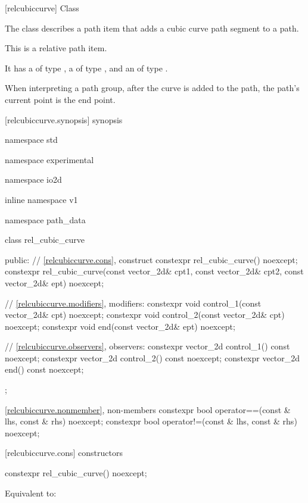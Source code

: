  [relcubiccurve] {Class }%

\pnum
{}%
The class  describes a path item that adds a cubic \bezierlocal curve path segment to a path.

\pnum
This is a relative path item.

\pnum
It has a  of type , a  of type , and an  of type .

\pnum
When interpreting a path group, after the curve is added to the path, the path's current point is the end point.

 [relcubiccurve.synopsis] { synopsis}%

\begin{codeblock}
namespace std { namespace experimental { namespace io2d { inline namespace v1 {
  namespace path_data {
    class rel_cubic_curve {
    public:
      // \ref{relcubiccurve.cons}, construct
      constexpr rel_cubic_curve() noexcept;
      constexpr rel_cubic_curve(const vector_2d& cpt1, const vector_2d& cpt2,
        const vector_2d& ept) noexcept;

      // \ref{relcubiccurve.modifiers}, modifiers:
      constexpr void control_1(const vector_2d& cpt) noexcept;
      constexpr void control_2(const vector_2d& cpt) noexcept;
      constexpr void end(const vector_2d& ept) noexcept;

      // \ref{relcubiccurve.observers}, observers:
      constexpr vector_2d control_1() const noexcept;
      constexpr vector_2d control_2() const noexcept;
      constexpr vector_2d end() const noexcept;
    };
    
    \ref{relcubiccurve.nonmember}, non-members
    constexpr bool operator==(const & lhs, const & rhs) noexcept;
    constexpr bool operator!=(const & lhs, const & rhs) noexcept;
  }
} } } }
\end{codeblock}

 [relcubiccurve.cons] { constructors}%

%
\begin{itemdecl}
constexpr rel_cubic_curve() noexcept;
\end{itemdecl}
\begin{itemdescr}
\pnum
\effects
Equivalent to: 
\end{itemdescr}

